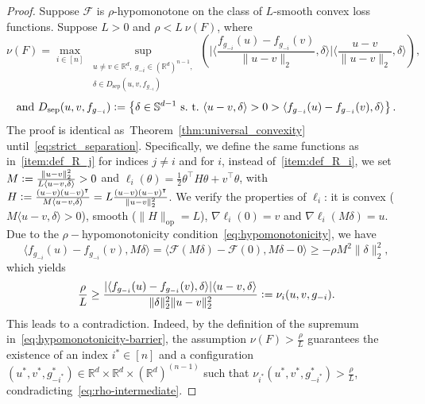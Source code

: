 \documentclass[twoside,11pt]{article}
\newcommand{\R}{\mathbb{R}}
\newcommand{\F}{\mathcal{F}}
\begin{document}
\begin{proof}
Suppose $\F$ is $\rho$-hypomonotone on the class of $L$-smooth convex loss functions.
Suppose $L>0$ and $\rho < L\ \nu(F)$, where 
\begin{equation}\label{eq:hypomonotonicity-barrier}
    \nu(F) = \max_{i\in[n]} \sup_{\substack{{u \neq v \in \R^d,\ g_{-i} \in (\R^d)^{n-1},} \\ {\delta \in D_{\text{sep}}(u, v, f_{g_{-i}})}}} \left( \Big|\Big\langle \frac{f_{g_{-i}}(u) - f_{g_{-i}}(v)}{\|u-v\|_2}, \delta \Big\rangle\Big| \Big\langle \frac{u - v}{\|u-v\|_2}, \delta \Big\rangle \right),
\end{equation}
\begin{equation*} 
    \text{and }D_{\text{sep}}(u, v, f_{g_{-i}}) \vcentcolon= \left\{ \delta \in \mathbb{S}^{d-1} \text{ s.\ t.\ } \langle u-v, \delta \rangle > 0 > \langle f_{g_{-i}}(u)-f_{g_{-i}}(v), \delta \rangle \right\}.
\end{equation*}
The proof is identical as~Theorem~\ref{thm:universal_convexity} until~\eqref{eq:strict_separation}.
Specifically, we define the same functions as in~\ref{item:def_R_j} for indices $j \neq i$ and for $i$, instead of~\ref{item:def_R_i}, we set $M \vcentcolon=  \frac{\|u-v\|^2_2}{L \langle u-v, \delta \rangle} > 0$ and $\ell_i(\theta) = \frac{1}{2} \theta^\intercal H \theta + v^\intercal \theta$, with $H \vcentcolon= \frac{(u-v) (u-v)^\intercal}{M \langle u-v, \delta \rangle} = L \frac{(u-v) (u-v)^\intercal}{\|u-v\|^2_2}$.
We verify the properties of $\ell_i$: it is convex ($M\langle u-v, \delta \rangle > 0$), smooth ($\|H\|_{\text{op}} = L$), $\nabla \ell_i(0) = v$ and $\nabla \ell_i(M\delta) = u$.
Due to the $\rho-$hypomonotonicity condition~\eqref{eq:hypomonotonicity}, we have
\begin{equation*}
    \langle f_{g_{-i}}(u) - f_{g_{-i}}(v), M\delta \rangle = \langle \F(M\delta) - \F(0), M\delta - 0 \rangle \geq - \rho M^2 \|\delta\|^2_2,    
\end{equation*}
which yields
\begin{equation}\label{eq:rho-intermediate}
    \frac{\rho}{L} \geq \frac{|\langle f_{g_{-i}}(u) - f_{g_{-i}}(v), \delta \rangle| \langle u - v, \delta \rangle}{\|\delta\|^2_2 \|u-v\|_2^2} \vcentcolon= \nu_i(u, v, g_{-i}).
\end{equation}
This leads to a contradiction. 
Indeed, by the definition of the supremum in~\eqref{eq:hypomonotonicity-barrier}, the assumption $\nu(F) > \frac{\rho}{L}$ guarantees the existence of an index $i^* \in [n]$ and a configuration $(u^*, v^*, g_{-i^*}^*) \in \R^d \times \R^d \times (\R^d)^{(n-1)}$ such that $\nu_{i^*}(u^*, v^*, g_{-i^*}^*) > \frac{\rho}{L}$, condradicting~\eqref{eq:rho-intermediate}.   

\end{proof}
\end{document}

